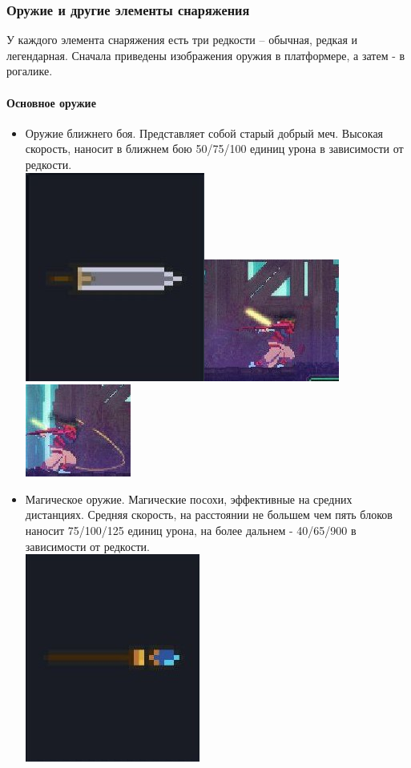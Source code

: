 \documentclass{article}
\begin{document}
\subsubsection{Оружие и другие элементы снаряжения}
У каждого элемента снаряжения есть три редкости – обычная, редкая и легендарная. Сначала приведены изображения оружия в платформере, а затем - в рогалике.
\paragraph{Основное оружие}
\begin{itemize}
\item Оружие ближнего боя.
Представляет собой старый добрый меч. Высокая скорость, наносит в ближнем бою 50/75/100 единиц урона в зависимости от редкости.\\
\includegraphics[width=0.23\linewidth]{images/dd_mech.jpg}\hspace{0.5cm}\includegraphics[width=0.3\linewidth]{images/dd_mech21.jpg}\hspace{0.5cm}\includegraphics[width=0.3\linewidth]{images/dd_mech22.jpg}
\item Магическое оружие.
Магические посохи, эффективные на средних дистанциях. Средняя скорость, на расстоянии не большем чем пять блоков наносит 75/100/125 единиц урона, на более дальнем - 40/65/900 в зависимости от редкости.\\
\includegraphics[width=0.23\linewidth]{images/dd_posoh.jpg}

\end{itemize}
\end{document}
